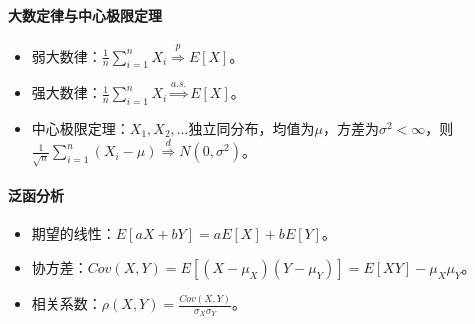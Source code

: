 \documentclass[
12pt, %
a4paper, 
oneside, %
headinclude,footinclude, %
]{scrartcl}
\begin{document}
\paragraph{大数定律与中心极限定理}
\begin{itemize}
\item 弱大数律：$ \frac{1}{n} \sum_{i=1}^n X_i \overset{p}{\Longrightarrow} E[X] $。
\item 强大数律：$ \frac{1}{n} \sum_{i=1}^n X_i \overset{a.s.}{\Longrightarrow} E[X] $。
\item 中心极限定理：$ X_1, X_2, \dots $独立同分布，均值为$ \mu $，方差为$ \sigma^2 < \infty $，则$ \frac{1}{\sqrt{n}} \sum_{i=1}^n (X_i - \mu) \overset{d}{\Longrightarrow} N(0, \sigma^2) $。
\end{itemize}
\paragraph{泛函分析}
\begin{itemize}
\item 期望的线性：$ E[aX + bY] = a E[X] + b E[Y] $。
\item 协方差：$ Cov(X, Y) = E[(X - \mu_X)(Y - \mu_Y)] = E[XY] - \mu_X \mu_Y $。
\item 相关系数：$ \rho(X, Y) = \frac{Cov(X, Y)}{\sigma_X \sigma_Y} $。
\end{itemize}
\end{document}
